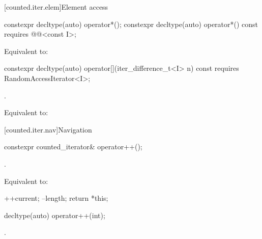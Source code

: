 \begin{addedblock}
[counted.iter.elem]{Element access}

%
%
\begin{itemdecl}
constexpr decltype(auto) operator*();
constexpr decltype(auto) operator*() const
  requires @@<const I>;
\end{itemdecl}

\begin{itemdescr}
\pnum
\effects Equivalent to: 
\end{itemdescr}

%
%
\begin{itemdecl}
constexpr decltype(auto) operator[](iter_difference_t<I> n) const
  requires RandomAccessIterator<I>;
\end{itemdecl}

\begin{itemdescr}
\pnum
\expects {}.

\pnum
\effects Equivalent to: 
\end{itemdescr}

[counted.iter.nav]{Navigation}

%
%
\begin{itemdecl}
constexpr counted_iterator& operator++();
\end{itemdecl}

\begin{itemdescr}
\pnum
\expects {}.

\pnum
\effects Equivalent to:
\begin{codeblock}
++current;
--length;
return *this;
\end{codeblock}
\end{itemdescr}

%
%
\begin{itemdecl}
decltype(auto) operator++(int);
\end{itemdecl}

\begin{itemdescr}
\pnum
\expects {}.


\end{itemdescr}
\end{addedblock}
